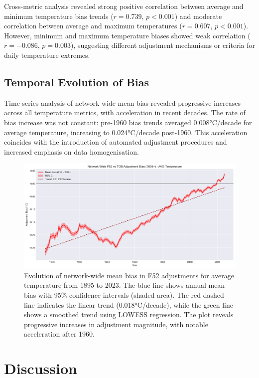 \documentclass[11pt, a4paper]{article}
\begin{document}
Cross-metric analysis revealed strong positive correlation between average and minimum temperature bias trends ($r = 0.739$, $p < 0.001$) and moderate correlation between average and maximum temperatures ($r = 0.607$, $p < 0.001$). However, minimum and maximum temperature biases showed weak correlation ($r = -0.086$, $p = 0.003$), suggesting different adjustment mechanisms or criteria for daily temperature extremes.

\subsection{Temporal Evolution of Bias}

Time series analysis of network-wide mean bias revealed progressive increases across all temperature metrics, with acceleration in recent decades. The rate of bias increase was not constant: pre-1960 bias trends averaged 0.008°C/decade for average temperature, increasing to 0.024°C/decade post-1960. This acceleration coincides with the introduction of automated adjustment procedures and increased emphasis on data homogenisation.

\begin{figure}[htbp]
    \centering
    \includegraphics[width=1.0\textwidth]{figures/bias_timeseries_avg.png}
    \caption{Evolution of network-wide mean bias in F52 adjustments for average temperature from 1895 to 2023. The blue line shows annual mean bias with 95\% confidence intervals (shaded area). The red dashed line indicates the linear trend (0.018°C/decade), while the green line shows a smoothed trend using LOWESS regression. The plot reveals progressive increases in adjustment magnitude, with notable acceleration after 1960.}
    \label{fig:timeseries}
\end{figure}

\section{Discussion}
\end{document}
